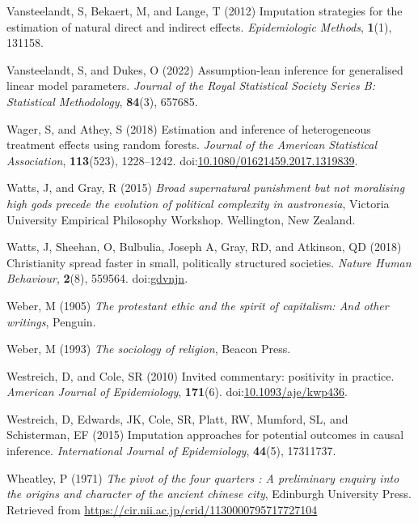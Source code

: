 \documentclass[
  singlecolumn,
  9pt]{article}
\begin{document}
\begin{CSLReferences}
Vansteelandt, S, Bekaert, M, and Lange, T (2012) Imputation strategies
for the estimation of natural direct and indirect effects.
\emph{Epidemiologic Methods}, \textbf{1}(1), 131158.

Vansteelandt, S, and Dukes, O (2022) Assumption-lean inference for
generalised linear model parameters. \emph{Journal of the Royal
Statistical Society Series B: Statistical Methodology}, \textbf{84}(3),
657685.

Wager, S, and Athey, S (2018) Estimation and inference of heterogeneous
treatment effects using random forests. \emph{Journal of the American
Statistical Association}, \textbf{113}(523), 1228--1242.
doi:\href{https://doi.org/10.1080/01621459.2017.1319839}{10.1080/01621459.2017.1319839}.

Watts, J, and Gray, R (2015) \emph{Broad supernatural punishment but not
moralising high gods precede the evolution of political complexity in
austronesia}, Victoria University Empirical Philosophy Workshop.
Wellington, New Zealand.

Watts, J, Sheehan, O, Bulbulia, Joseph A, Gray, RD, and Atkinson, QD
(2018) Christianity spread faster in small, politically structured
societies. \emph{Nature Human Behaviour}, \textbf{2}(8), 559564.
doi:\href{https://doi.org/gdvnjn}{gdvnjn}.

Weber, M (1905) \emph{The protestant ethic and the spirit of capitalism:
And other writings}, Penguin.

Weber, M (1993) \emph{The sociology of religion}, Beacon Press.

Westreich, D, and Cole, SR (2010) Invited commentary: positivity in
practice. \emph{American Journal of Epidemiology}, \textbf{171}(6).
doi:\href{https://doi.org/10.1093/aje/kwp436}{10.1093/aje/kwp436}.

Westreich, D, Edwards, JK, Cole, SR, Platt, RW, Mumford, SL, and
Schisterman, EF (2015) Imputation approaches for potential outcomes in
causal inference. \emph{International Journal of Epidemiology},
\textbf{44}(5), 17311737.

Wheatley, P (1971) \emph{The pivot of the four quarters : A preliminary
enquiry into the origins and character of the ancient chinese city},
Edinburgh University Press. Retrieved from
\url{https://cir.nii.ac.jp/crid/1130000795717727104}


\end{CSLReferences}
\end{document}
